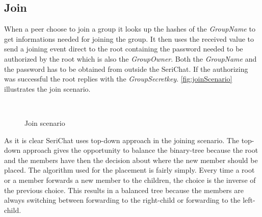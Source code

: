 \subsection{Join}
When a peer choose to join a group it looks up the hashes of the \textit{GroupName} to get informations needed for joining the group. It then uses the received value to send a joining event direct to the root containing the password needed to be authorized by the root which is also the \textit{GroupOwner}. Both the \textit{GroupName} and the password has to be obtained from outside the SeriChat. If the authorizing was successful the root replies with the \textit{GroupSecretkey}. \autoref{fig:joinScenario} illustrates the join scenario.

\begin{figure}[bth]
	\myfloatalign
	 \quad
	 \\
	\caption{Join scenario}\label{fig:joinScenario}
\end{figure}

As it is clear SeriChat uses top-down approach in the joining scenario. The top-down approach gives the opportunity to balance the binary-tree because the root and the members have then the decision about where the new member should be placed. The algorithm used for the placement is fairly simply. Every time a root or a member forwards a new member to the children, the choice is the inverse of the previous choice. This results in a balanced tree because the members are always switching between forwarding to the right-child or forwarding to the left-child.

